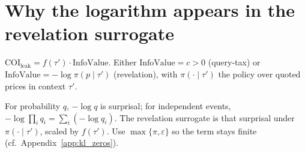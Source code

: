 \documentclass[12pt,letterpaper]{article}
\begin{document}
\section{Why the logarithm appears in the revelation surrogate}
\label{app:revelation_log}

$\text{COI}_{\text{leak}} = f(\tau')\cdot\text{InfoValue}$. Either $\text{InfoValue}=c>0$ (query-tax) or $\text{InfoValue}=-\log\pi(p\mid\tau')$ (revelation), with $\pi(\cdot\mid\tau')$ the policy over quoted prices in context $\tau'$.

For probability $q$, $-\log q$ is surprisal; for independent events, $-\log\prod_i q_i=\sum_i(-\log q_i)$. The revelation surrogate is that surprisal under $\pi(\cdot\mid\tau')$, scaled by $f(\tau')$. Use $\max\{\pi,\varepsilon\}$ so the term stays finite (cf.\ Appendix~\ref{app:kl_zeros}).
\end{document}
